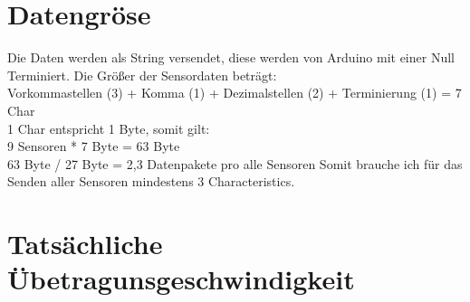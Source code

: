 \section{Datengröse}
Die Daten werden als String versendet, diese werden von Arduino mit einer
Null Terminiert. Die Größer der Sensordaten beträgt:\\
Vorkommastellen (3) + Komma (1) + Dezimalstellen (2) + Terminierung (1) = 7 Char
\\
1 Char entspricht 1 Byte, somit gilt:\\
9 Sensoren * 7 Byte = 63 Byte\\
63 Byte / 27 Byte = 2,3 Datenpakete pro alle Sensoren
Somit brauche ich für das Senden aller Sensoren mindestens 3 Characteristics.

\section{Tatsächliche Übetragunsgeschwindigkeit}
